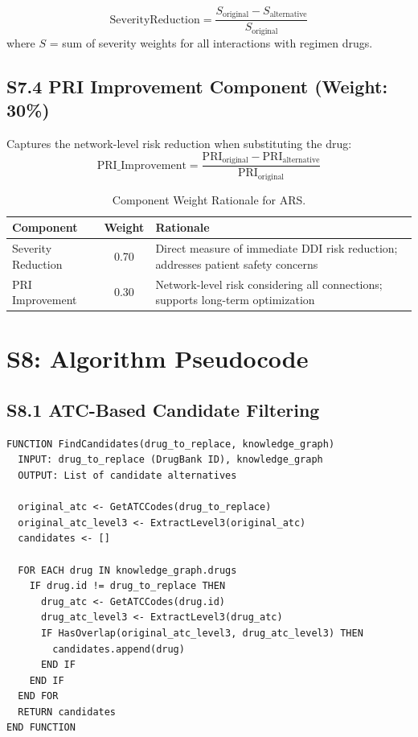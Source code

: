 \documentclass[12pt,a4paper]{article}
\begin{document}
\[
\text{SeverityReduction} = \frac{S_{\text{original}} - S_{\text{alternative}}}{S_{\text{original}}}
\]
where $S$ = sum of severity weights for all interactions with regimen drugs.

\subsection{S7.4 PRI Improvement Component (Weight: 30\%)}

Captures the network-level risk reduction when substituting the drug:
\[
\text{PRI\_Improvement} = \frac{\text{PRI}_{\text{original}} - \text{PRI}_{\text{alternative}}}{\text{PRI}_{\text{original}}}
\]

\begin{table}[H]
\centering
\caption{Component Weight Rationale for ARS.}
\label{tab:ars_weights}
\begin{tabular}{@{}lcp{7cm}@{}}
\toprule
\textbf{Component} & \textbf{Weight} & \textbf{Rationale} \\
\midrule
Severity Reduction & 0.70 & Direct measure of immediate DDI risk reduction; addresses patient safety concerns \\
PRI Improvement & 0.30 & Network-level risk considering all connections; supports long-term optimization \\
\bottomrule
\end{tabular}
\end{table}

\section{S8: Algorithm Pseudocode}
\label{sec:s8}

\subsection{S8.1 ATC-Based Candidate Filtering}

\begin{verbatim}
FUNCTION FindCandidates(drug_to_replace, knowledge_graph)
  INPUT: drug_to_replace (DrugBank ID), knowledge_graph
  OUTPUT: List of candidate alternatives
  
  original_atc <- GetATCCodes(drug_to_replace)
  original_atc_level3 <- ExtractLevel3(original_atc)
  candidates <- []
  
  FOR EACH drug IN knowledge_graph.drugs
    IF drug.id != drug_to_replace THEN
      drug_atc <- GetATCCodes(drug.id)
      drug_atc_level3 <- ExtractLevel3(drug_atc)
      IF HasOverlap(original_atc_level3, drug_atc_level3) THEN
        candidates.append(drug)
      END IF
    END IF
  END FOR
  RETURN candidates
END FUNCTION
\end{verbatim}
\end{document}
